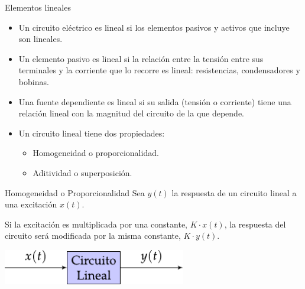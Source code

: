 \documentclass[aspectratio=169, usenames,svgnames,dvipsnames]{beamer}
\begin{document}
\begin{frame}[label={sec:org5f73c63}]{Elementos lineales}
\begin{itemize}
\item Un circuito eléctrico es lineal si los elementos pasivos y activos que incluye son lineales.
\item Un \alert{elemento pasivo} es lineal si la relación entre la tensión entre sus terminales y la corriente que lo recorre es lineal: \alert{resistencias, condensadores y bobinas}.
\item Una \alert{fuente dependiente} es lineal si su salida (tensión o corriente) tiene una relación lineal con la magnitud del circuito de la que depende.
\item Un circuito lineal tiene dos propiedades:
\begin{itemize}
\item Homogeneidad o \alert{proporcionalidad}.
\item Aditividad o \alert{superposición}.
\end{itemize}
\end{itemize}
\end{frame}

\begin{frame}[label={sec:orgef724a2}]{Homogeneidad o Proporcionalidad}
Sea \(y(t)\) la respuesta de un \alert{circuito lineal} a una excitación \(x(t)\). 

Si la excitación es multiplicada por una \alert{constante}, \(K \cdot x(t)\), la respuesta del circuito será modificada por la misma constante, \(K \cdot y(t)\).

\begin{center}
\includegraphics[width=0.6\textwidth]{../figs/proporcionalidad.pdf}
\end{center}
\end{frame}
\end{document}
